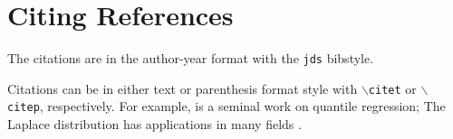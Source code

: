 \documentclass[letterpaper,inpress]{jdsart}
\begin{document}
\hypertarget{citing-references}{%
\section{Citing References}\label{citing-references}}

The citations are in the author-year format with the
\texttt{jds} bibstyle.

Citations can be in either text or parenthesis format style with
\texttt{$\backslash$citet} or \texttt{$\backslash$citep},
respectively. For example, \citet{KoenkerBassett1978} is a seminal
work on quantile regression; The Laplace distribution has applications
in many fields \citep{Kotz2001}.



\end{document}
